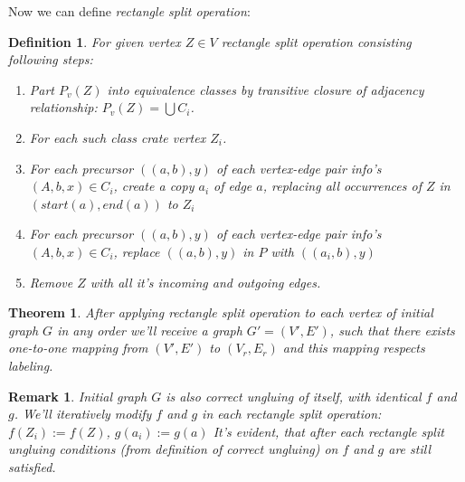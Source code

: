 \documentclass[12pt,a4paper,oneside]{article}
\newtheorem{theorem}{Theorem}
\newtheorem{definition}{Definition}
\newtheorem{remark}{Remark}
\begin{document}
Now we can define \emph{rectangle split operation}:
\begin{definition}
For given vertex $Z \in V$ rectangle split operation consisting following steps:
\begin{enumerate}
\item Part $P_v(Z)$ into equivalence classes by transitive closure of adjacency relationship: $P_v(Z) = \bigcup C_i$. 
\item For each such class crate vertex $Z_i$.
\item For each precursor $((a, b), y)$ of each vertex-edge pair info's $(A, b, x) \in C_i$,  create a copy $a_i$ of edge $a$, replacing all occurrences of $Z$ in $(start(a), end(a))$ to $Z_i$  
\item For each precursor $((a, b), y)$ of each vertex-edge pair info's $(A, b, x) \in C_i$, replace $((a, b), y)$ in $P$ with $((a_i, b), y)$
\item Remove $Z$ with all it's incoming and outgoing edges.
\end{enumerate} 
\end{definition} 
\begin{theorem}
  After applying rectangle split operation to each vertex of initial graph $G$ in any order we'll receive a graph $G' = (V', E')$, such that there exists one-to-one mapping from $(V', E')$ to $(V_r, E_r)$ and this mapping respects labeling.
\end{theorem}
\begin{remark}
 Initial graph $G$ is also correct ungluing of itself, with identical $f$ and $g$. We'll iteratively modify $f$ and $g$ in each rectangle split operation:
$f(Z_i):= f(Z)$, $g(a_i):= g(a)$
 It's evident, that after each rectangle split ungluing conditions (from definition of correct ungluing) on $f$ and $g$ are still satisfied.
\end{remark}
\end{document}
